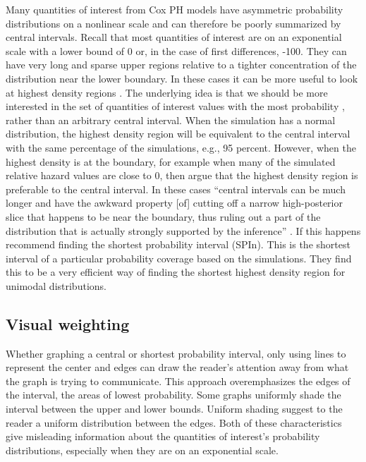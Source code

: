 \documentclass[nojss]{jss}\usepackage[]{graphicx}\usepackage[]{color}
\begin{document}
Many quantities of interest from Cox PH models have asymmetric probability distributions on a nonlinear scale and can therefore be poorly summarized by central intervals. Recall that most quantities of interest are on an exponential scale with a lower bound of 0 or, in the case of first differences, -100. They can have very long and sparse upper regions relative to a tighter concentration of the distribution near the lower boundary. In these cases it can be more useful to look at highest density regions \citep[see][]{Box1973,Hyndman1996}. The underlying idea is that we should be more interested in the set of quantities of interest values with the most probability \cite[p. 120]{Hyndman1996}, rather than an arbitrary central interval. When the simulation has a normal distribution, the highest density region will be equivalent to the central interval with the same percentage of the simulations, e.g., 95 percent. However, when the highest density is at the boundary, for example when many of the simulated relative hazard values are close to 0, then \cite{Liu2013} argue that the highest density region is preferable to the central interval. In these cases ``central intervals can be much longer and have the awkward property [of] cutting off a narrow high-posterior slice that happens to be near the boundary, thus ruling out a part of the distribution that is actually strongly supported by the inference'' \citep[p. 2]{Liu2013}. If this happens \citeauthor{Liu2013} recommend finding the shortest probability interval (SPIn). This is the shortest interval of a particular probability coverage based on the simulations. They find this to be a very efficient way of finding the shortest highest density region for unimodal distributions.

\subsection{Visual weighting}

Whether graphing a central or shortest probability interval, only using lines to represent the center and edges can draw the reader's attention away from what the graph is trying to communicate. This approach overemphasizes the edges of the interval, the areas of lowest probability. Some graphs uniformly shade the interval between the upper and lower bounds. Uniform shading suggest to the reader a uniform distribution between the edges. Both of these characteristics give misleading information about the quantities of interest's probability distributions, especially when they are on an exponential scale.
\end{document}
